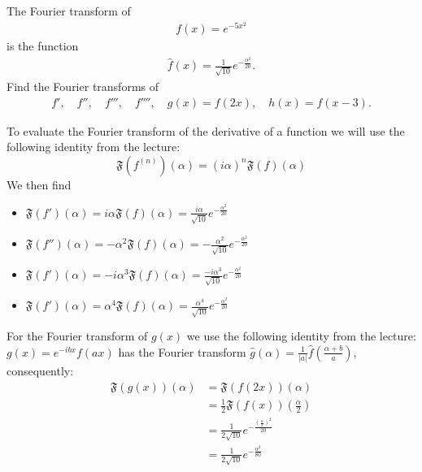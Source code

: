 \documentclass[11pt]{article}
\begin{document}
\begin{exercise}
    The Fourier transform of 
    \begin{align*}
        f(x) = e^{-5x^2}
    \end{align*}
    is the function 
    \begin{align*}
        \hat f(x) = \frac{1}{\sqrt{10}} e^{-\frac{\alpha^2}{20}}.
    \end{align*}
    Find the Fourier transforms of 
    \begin{align*}
     f', \quad f'', \quad f''', \quad f'''', \quad g(x) = f(2x), \quad h(x) = f(x-3).
    \end{align*}
\end{exercise}
\begin{solution}  
    To evaluate the Fourier transform of the derivative of a function we will use the following identity from the lecture:
    \[
        \mathfrak{F}\left(f^{(n)}\right)(\alpha)=(i \alpha)^n \mathfrak{F}(f)(\alpha)
    \]
    We then find 
    \begin{itemize}
    \item $\mathfrak{F}\left(f' \right)(\alpha) = i \alpha \mathfrak{F}(f)(\alpha) = \frac{i \alpha}{\sqrt{10}} e^{-\frac{\alpha^2}{20}}$
    \item $\mathfrak{F}\left(f'' \right)(\alpha) = -\alpha^2 \mathfrak{F}(f)(\alpha) = -\frac{ \alpha^2}{\sqrt{10}} e^{-\frac{\alpha^2}{20}}$
    \item $\mathfrak{F}\left(f' \right)(\alpha) = -i \alpha^3 \mathfrak{F}(f)(\alpha) = \frac{-i \alpha^3}{\sqrt{10}} e^{-\frac{\alpha^2}{20}}$
    \item $\mathfrak{F}\left(f' \right)(\alpha) = \alpha^4 \mathfrak{F}(f)(\alpha) = \frac{ \alpha^4}{\sqrt{10}} e^{-\frac{\alpha^2}{20}}$
    \end{itemize}
    For the Fourier transform of $g(x)$ we use the following identity from the lecture: 
    $g(x)=e^{-i b x} f(a x)$ has the Fourier transform
    $\hat{g}(\alpha)=\frac{1}{|a|} \hat{f}\left(\frac{\alpha+b}{a}\right)$,
    consequently:
    \begin{align*}
        \mathfrak{F}(g(x))(\alpha) & =\mathfrak{F}(f(2 x))(\alpha) \\ & =\frac{1}{2} \mathfrak{F}(f(x))\left(\frac{\alpha}{2}\right) \\ & =\frac{1}{2 \sqrt{10}} e^{-\frac{\left(\frac{\alpha}{2}\right)^2}{20}} \\ & =\frac{1}{2 \sqrt{10}} e^{-\frac{\alpha^2}{80}}
    \end{align*}

\end{solution}
\end{document}
